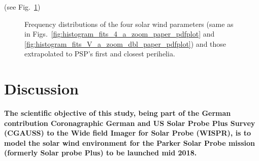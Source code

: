 (see Fig.~\ref{fig:SPP_sw_distributions})\\
\begin{figure}
	\caption{Frequency distributions of the four solar wind parameters (same as in Figs.~\ref{fig:histogram_fits_4_a_zoom_paper_pdfplot} and \ref{fig:histogram_fits_V_a_zoom_dbl_paper_pdfplot}) and those extrapolated to PSP's first and closest perihelia.}
	\label{fig:SPP_sw_distributions}
\end{figure}


\section{Discussion}
\label{sec:discussion}
\textbf{The scientific objective of this study, being part of the German contribution Coronagraphic German and US Solar Probe Plus Survey (CGAUSS) to the Wide field Imager for Solar Probe (WISPR), is to model the solar wind environment for the Parker Solar Probe mission (formerly Solar probe Plus) to be launched mid 2018.}

